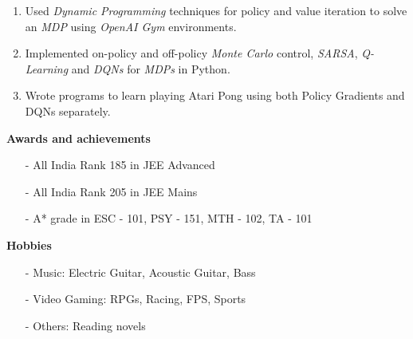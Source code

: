 \documentclass{article}
\begin{document}
\begin{enumerate}[leftmargin=12.5mm]
\begin{enumerate}
                \item Used {\it Dynamic Programming} techniques for policy and value iteration to solve an {\it MDP} using {\it OpenAI Gym} environments.
                \item Implemented on-policy and off-policy {\it Monte Carlo} control, {\it SARSA}, {\it Q-Learning} and {\it DQNs} for {\it MDPs} in Python.
                \item Wrote programs to learn playing Atari Pong using both Policy Gradients and DQNs separately.
            \end{enumerate}
    \end{enumerate}

    \textbf{Awards and achievements}
    \begin{itemize}[leftmargin=12.5mm]
        \item[-] All India Rank 185 in JEE Advanced
        \item[-] All India Rank 205 in JEE Mains
        \item[-] A* grade in ESC - 101, PSY - 151, MTH - 102, TA - 101
    \end{itemize}

    \textbf{Hobbies}
    \begin{itemize}[leftmargin=12.5mm]
        \item[-] Music: Electric Guitar, Acoustic Guitar, Bass
        \item[-] Video Gaming: RPGs, Racing, FPS, Sports
        \item[-] Others: Reading novels
    \end{itemize}
\end{document}
